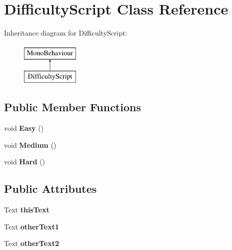 \hypertarget{class_difficulty_script}{}\section{Difficulty\+Script Class Reference}
\label{class_difficulty_script}
Inheritance diagram for Difficulty\+Script\+:\begin{figure}[H]
\begin{center}
\leavevmode
\includegraphics[height=2.000000cm]{class_difficulty_script}
\end{center}
\end{figure}
\subsection*{Public Member Functions}
\begin{DoxyCompactItemize}
\item 
\hypertarget{class_difficulty_script_ad8913d5e49546c27235a5237a8338a48}{}void {\bfseries Easy} ()\label{class_difficulty_script_ad8913d5e49546c27235a5237a8338a48}

\item 
\hypertarget{class_difficulty_script_aaa1f844ba07536daad09d0d953f15ee9}{}void {\bfseries Medium} ()\label{class_difficulty_script_aaa1f844ba07536daad09d0d953f15ee9}

\item 
\hypertarget{class_difficulty_script_a114d050f8e4c4bc684728ea9d4f143d1}{}void {\bfseries Hard} ()\label{class_difficulty_script_a114d050f8e4c4bc684728ea9d4f143d1}

\end{DoxyCompactItemize}
\subsection*{Public Attributes}
\begin{DoxyCompactItemize}
\item 
\hypertarget{class_difficulty_script_a6cf366e11e24688822b51ad02a591d12}{}Text {\bfseries this\+Text}\label{class_difficulty_script_a6cf366e11e24688822b51ad02a591d12}

\item 
\hypertarget{class_difficulty_script_ac35d383f05d94d0388dae2aa9544aeec}{}Text {\bfseries other\+Text1}\label{class_difficulty_script_ac35d383f05d94d0388dae2aa9544aeec}

\item 
\hypertarget{class_difficulty_script_a88e0b2f1fdb864f25e32c7945467befa}{}Text {\bfseries other\+Text2}\label{class_difficulty_script_a88e0b2f1fdb864f25e32c7945467befa}

\end{DoxyCompactItemize}

